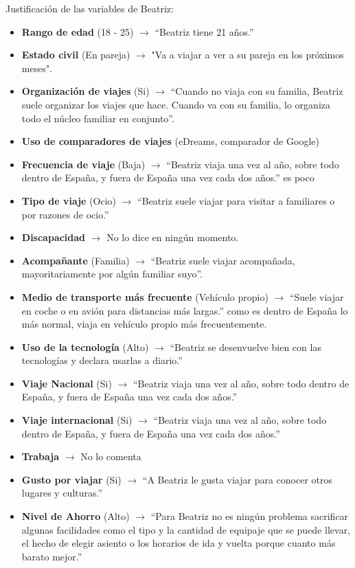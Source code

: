 \noindent Justificación de las variables de Beatriz:
\begin{itemize}
    \item \textbf{Rango de edad} (18 - 25) $\rightarrow$ “Beatriz tiene 21 años.”
    \item \textbf{Estado civil} (En pareja) $\rightarrow$ "Va a viajar a ver a su pareja en los próximos meses".
    \item \textbf{Organización de viajes} (Si) $\rightarrow$ “Cuando no viaja con su familia, Beatriz suele organizar los viajes que hace. Cuando va con su familia, lo organiza todo el núcleo familiar en conjunto”.
    \item \textbf{Uso de comparadores de viajes} (eDreams, comparador de Google)
    \item \textbf{Frecuencia de viaje} (Baja) $\rightarrow$ “Beatriz viaja una vez al año, sobre todo dentro de España, y fuera de España una vez cada dos años.” es poco
    \item \textbf{Tipo de viaje} (Ocio) $\rightarrow$ “Beatriz suele viajar para visitar a familiares o por razones de ocio.”
    \item \textbf{Discapacidad} $\rightarrow$ No lo dice en ningún momento.
    \item \textbf{Acompañante} (Familia) $\rightarrow$ “Beatriz suele viajar acompañada, mayoritariamente por algún familiar suyo”.
    \item \textbf{Medio de transporte más frecuente} (Vehículo propio) $\rightarrow$ “Suele viajar en coche o en avión para distancias más largas.” como es dentro de España lo más normal, viaja en vehículo propio más frecuentemente.
    \item \textbf{Uso de la tecnología} (Alto) $\rightarrow$ “Beatriz se desenvuelve bien con las tecnologías y declara usarlas a diario.”
    \item \textbf{Viaje Nacional} (Si) $\rightarrow$ “Beatriz viaja una vez al año, sobre todo dentro de España, y fuera de España una vez cada dos años.”
    \item \textbf{Viaje internacional} (Si) $\rightarrow$ “Beatriz viaja una vez al año, sobre todo dentro de España, y fuera de España una vez cada dos años.”
    \item \textbf{Trabaja} $\rightarrow$ No lo comenta
    \item \textbf{Gusto por viajar} (Si) $\rightarrow$ “A Beatriz le gusta viajar para conocer otros lugares y culturas.”
    \item \textbf{Nivel de Ahorro} (Alto) $\rightarrow$ “Para Beatriz no es ningún problema sacrificar algunas facilidades como el  tipo y la cantidad de equipaje que se puede llevar, el hecho de elegir asiento o los horarios de ida y vuelta porque cuanto más barato mejor.”
\end{itemize}

